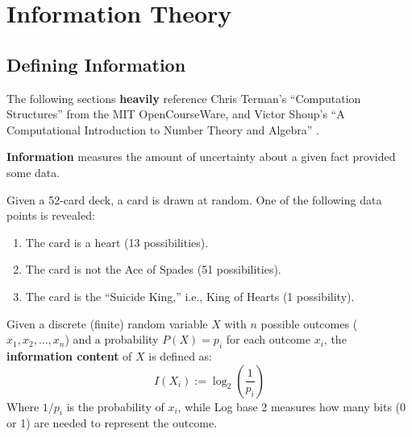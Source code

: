 \section{Information Theory}
\subsection{Defining Information}

\noindent
The following sections \textbf{heavily} reference Chris Terman's ``Computation Structures'' from the MIT OpenCourseWare,
and Victor Shoup's ``A Computational Introduction to Number Theory and Algebra'' \cite{terman2017computation_structures, shoup2008computational_introduction_ntb_v2}.

\begin{Def}[Information]

    \label{def:info}

    \textbf{Information} measures the amount of uncertainty about a given fact provided some data.
\end{Def}

\begin{Example}

    \label{ex:card_info}

    Given a 52-card deck, a card is drawn at random. One of the following data points is revealed:
    \renewcommand{\labelenumi}{\alph{enumi})}
    \begin{enumerate}
        \item The card is a heart (13 possibilities).
        \item The card is not the Ace of Spades (51 possibilities).
        \item The card is the ``Suicide King,'' i.e., King of Hearts (1 possibility).
    \end{enumerate}

    \vspace{-1.5em}
\end{Example}

\begin{Def}

    \label{def:quant_info}

    Given a discrete (finite) random variable $X$ with $n$ possible outcomes ($x_1, x_2, \ldots, x_n$) and a probability $P(X) = p_i$ for each outcome $x_i$, the \textbf{information content} of $X$ is defined as:
    \[
    I(X_i) := \log_2\left(\dfrac{1}{p_i}\right)
    \]
    \noindent
    Where $1/p_i$ is the probability of $x_i$, while Log base 2 measures how many bits (0 or 1) are needed to represent the outcome.
\end{Def}

